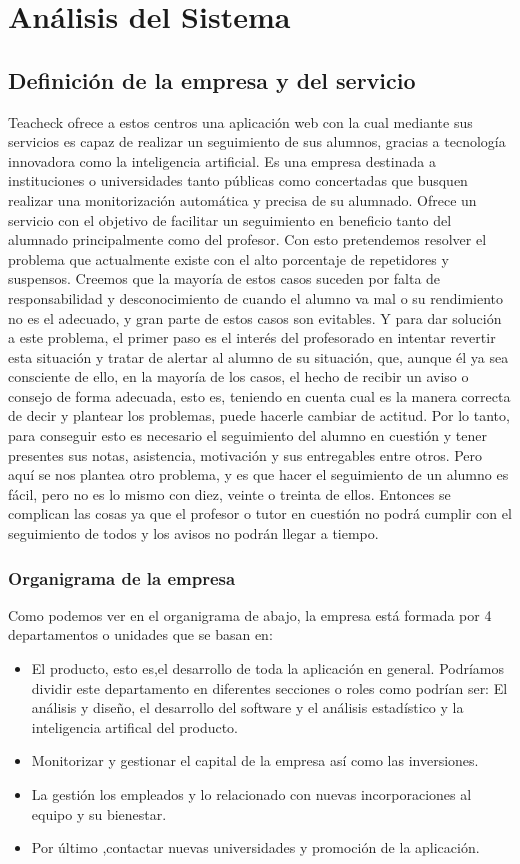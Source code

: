 \chapter{Análisis del Sistema}
\section{Definición de la empresa y del servicio}
Teacheck ofrece a estos centros una aplicación web con la cual mediante sus servicios es capaz de realizar un seguimiento de sus alumnos, gracias a tecnología innovadora como la inteligencia artificial.
Es una empresa destinada a instituciones o universidades tanto públicas como concertadas que busquen realizar una monitorización automática y precisa de su alumnado. Ofrece un servicio con el objetivo de facilitar un seguimiento en beneficio tanto del alumnado principalmente como del profesor. Con esto pretendemos resolver el problema que actualmente existe con el alto porcentaje de repetidores y suspensos. Creemos que la mayoría de estos casos suceden por falta de responsabilidad y desconocimiento de cuando el alumno va mal o su rendimiento no es el adecuado, y gran parte de estos casos son evitables. Y para dar solución a este problema, el primer paso es el interés del profesorado en intentar revertir esta situación y tratar de alertar al alumno de su situación, que, aunque él ya sea consciente de ello, en la mayoría de los casos, el hecho de recibir un aviso o consejo de forma adecuada, esto es, teniendo en cuenta cual es la manera correcta de decir y plantear los problemas, puede hacerle cambiar de actitud. Por lo tanto, para conseguir esto es necesario el seguimiento del alumno en cuestión y tener presentes sus notas, asistencia, motivación y sus entregables entre otros. Pero aquí se nos plantea otro problema, y es que hacer el seguimiento de un alumno es fácil, pero no es lo mismo con diez, veinte o treinta de ellos. Entonces se complican las cosas ya que el profesor o tutor en cuestión no podrá cumplir con el seguimiento de todos y los avisos no podrán llegar a tiempo. 
\subsection{Organigrama de la empresa}
Como podemos ver en el organigrama de abajo, la empresa está formada por 4 departamentos o unidades que se basan en:
\begin{itemize}
\item{El producto, esto es,el desarrollo de toda la aplicación en general. Podríamos dividir este departamento en diferentes secciones o roles como podrían ser: El análisis y diseño, el desarrollo del software y el análisis estadístico y la inteligencia artifical del producto.}
\item{Monitorizar y gestionar el capital de la empresa así como las inversiones.}
\item{La gestión los empleados y lo relacionado con nuevas incorporaciones al equipo y su bienestar.}
\item{Por último ,contactar nuevas universidades y promoción de la aplicación.}
\end{itemize}
\subparagraph{}
